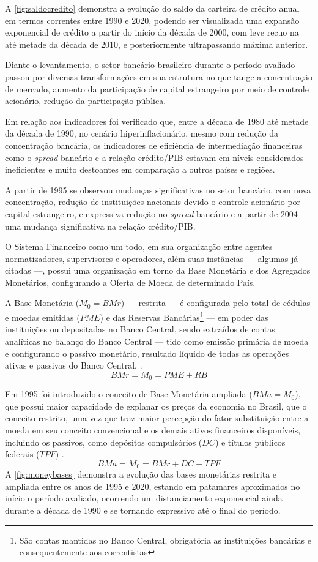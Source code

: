 \documentclass[12pt,12pt,openright,oneside,a4paper,chapter=TITLE,section=TITLE,subsection=TITLE,subsubsection=TITLE,english,french,spanish,portugues,sumario=tradicional]{abntex2}
\begin{document}
A \autoref{fig:saldocredito} demonstra a evolução do saldo da carteira de crédito anual em termos correntes entre 1990 e 2020, podendo ser visualizada uma expansão exponencial de crédito a partir do início da década de 2000, com leve recuo na até metade da década de 2010, e posteriormente ultrapassando máxima anterior.

Diante o levantamento, o setor bancário brasileiro durante o período avaliado
passou por diversas transformações em sua estrutura no que tange a concentração
de mercado, aumento da participação de capital estrangeiro por meio de controle
acionário, redução da participação pública.

Em relação aos indicadores foi verificado que, entre a década de 1980 até metade da década de 1990, no cenário hiperinflacionário, mesmo com redução da
concentração bancária, os indicadores de eficiência de intermediação
financeiras como o \emph{spread} bancário e a relação crédito/PIB estavam em níveis
considerados ineficientes e muito destoantes em comparação a outros países e
regiões.

A partir de 1995 se observou mudanças significativas no setor bancário, com
nova concentração, redução de instituições nacionais devido o controle
acionário por capital estrangeiro, e expressiva redução no \emph{spread} bancário e
a partir de 2004 uma mudança significativa na relação crédito/PIB.

O Sistema Financeiro como um todo, em sua organização entre agentes normatizadores, supervisores e operadores, além suas instâncias --- algumas já citadas ---, possui uma organização em torno da Base Monetária e dos Agregados Monetários, configurando a Oferta de Moeda de determinado País.

A Base Monetária (\(M_0 = BMr\)) --- restrita --- é configurada pelo total de cédulas e moedas emitidas (\(PME\)) e das Reservas Bancárias\footnote{São contas mantidas no Banco Central, obrigatória as instituições bancárias e consequentemente aos correntistas} --- em poder das instituições ou depositadas no Banco Central, sendo extraídos de contas analíticas no balanço do Banco Central --- tido como emissão primária de moeda e configurando o passivo monetário, resultado líquido de todas as operações ativas e passivas do Banco Central. \cite{bcb:2019}.
\[
BMr = M_0 = PME + RB
\]

Em 1995 foi introduzido o conceito de Base Monetária ampliada (\(BMa = M_0\)), que possui maior capacidade de explanar os preços da economia no Brasil, que o conceito restrito, uma vez que traz maior percepção do fator substituição entre a moeda em seu conceito convencional e os demais ativos financeiros disponíveis, incluindo os passivos, como depósitos compulsórios (\(DC\)) e títulos públicos federais (\(TPF\)) \cite{bcb:2019}.
\[
BMa = M_0 = BMr + DC+  TPF
\]
A \autoref{fig:moneybases} demonstra a evolução das bases monetárias restrita e ampliada entre os anos de 1995 e 2020, estando em patamares aproximados no início o período avaliado, ocorrendo um distanciamento exponencial ainda durante a década de 1990 e se tornando expressivo até o final do período.
\end{document}
